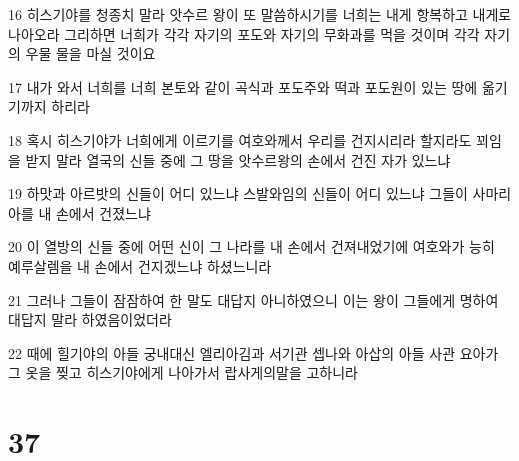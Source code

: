 \par 16 히스기야를 청종치 말라 앗수르 왕이 또 말씀하시기를 너희는 내게 항복하고 내게로 나아오라 그리하면 너희가 각각 자기의 포도와 자기의 무화과를 먹을 것이며 각각 자기의 우물 물을 마실 것이요
\par 17 내가 와서 너희를 너희 본토와 같이 곡식과 포도주와 떡과 포도원이 있는 땅에 옮기기까지 하리라
\par 18 혹시 히스기야가 너희에게 이르기를 여호와께서 우리를 건지시리라 할지라도 꾀임을 받지 말라 열국의 신들 중에 그 땅을 앗수르왕의 손에서 건진 자가 있느냐
\par 19 하맛과 아르밧의 신들이 어디 있느냐 스발와임의 신들이 어디 있느냐 그들이 사마리아를 내 손에서 건졌느냐
\par 20 이 열방의 신들 중에 어떤 신이 그 나라를 내 손에서 건져내었기에 여호와가 능히 예루살렘을 내 손에서 건지겠느냐 하셨느니라
\par 21 그러나 그들이 잠잠하여 한 말도 대답지 아니하였으니 이는 왕이 그들에게 명하여 대답지 말라 하였음이었더라
\par 22 때에 힐기야의 아들 궁내대신 엘리아김과 서기관 셉나와 아삽의 아들 사관 요아가 그 옷을 찢고 히스기야에게 나아가서 랍사게의말을 고하니라

\chapter{37}

